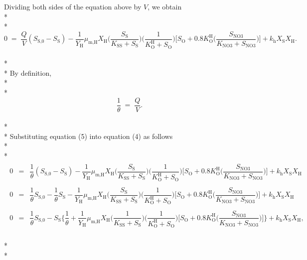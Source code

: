 \documentclass[]{article}
\begin{document}
Dividing both sides of the equation above by $V$, we obtain \\* \\* 
\begin{equation}
0 \; = \; \dfrac{Q}{V}(S_{\text{S,0}} - S_{\text{S}}) -\dfrac{1}{Y_{\text{H}}}\mu_{\text{m,H}}X_{\text{H}}\Bigg(\dfrac{S_{\text{S}}}{K_{\text{SS}}+S_{\text{S}}}\Bigg)\Bigg(\dfrac{1}{K^{\text{H}}_{\text{O}}+S_{\text{O}}}\Bigg)\Bigg[S_{\text{O}} + 0.8K^{\text{H}}_{\text{O}}\Bigg(\dfrac{S_{\text{NO3}}}{K_{\text{NO3}}+S_{\text{NO3}}}\Bigg)\Bigg] + k_{\text{h}}X_{\text{S}}X_{\text{H}}.
\end{equation} \\* \\* 
By definition, \\* \\* 
\begin{equation}
\dfrac{1}{\theta} \; = \; \dfrac{Q}{V}.
\end{equation} \\* \\* 
Substituting equation (5) into equation (4) as follows \\* \\* 
\begin{align}
\nonumber
\begin{array}{rcl}
0 &=& \dfrac{1}{\theta}(S_{\text{S,0}} - S_{\text{S}}) -\dfrac{1}{Y_{\text{H}}}\mu_{\text{m,H}}X_{\text{H}}\Bigg(\dfrac{S_{\text{S}}}{K_{\text{SS}}+S_{\text{S}}}\Bigg)\Bigg(\dfrac{1}{K^{\text{H}}_{\text{O}}+S_{\text{O}}}\Bigg)\Bigg[S_{\text{O}} + 0.8K^{\text{H}}_{\text{O}}\Bigg(\dfrac{S_{\text{NO3}}}{K_{\text{NO3}}+S_{\text{NO3}}}\Bigg)\Bigg] + k_{\text{h}}X_{\text{S}}X_{\text{H}} \\ \\
0 &=& \dfrac{1}{\theta}S_{\text{S,0}} - \dfrac{1}{\theta}S_{\text{S}} -\dfrac{1}{Y_{\text{H}}}\mu_{\text{m,H}}X_{\text{H}}\Bigg(\dfrac{S_{\text{S}}}{K_{\text{SS}}+S_{\text{S}}}\Bigg)\Bigg(\dfrac{1}{K^{\text{H}}_{\text{O}}+S_{\text{O}}}\Bigg)\Bigg[S_{\text{O}} + 0.8K^{\text{H}}_{\text{O}}\Bigg(\dfrac{S_{\text{NO3}}}{K_{\text{NO3}}+S_{\text{NO3}}}\Bigg)\Bigg] + k_{\text{h}}X_{\text{S}}X_{\text{H}} \\ \\
0 &=& \dfrac{1}{\theta}S_{\text{S,0}} - S_{\text{S}} \Bigg\{\dfrac{1}{\theta} + \dfrac{1}{Y_{\text{H}}}\mu_{\text{m,H}}X_{\text{H}}\Bigg(\dfrac{1}{K_{\text{SS}}+S_{\text{S}}}\Bigg)\Bigg(\dfrac{1}{K^{\text{H}}_{\text{O}}+S_{\text{O}}}\Bigg)\Bigg[S_{\text{O}} + 0.8K^{\text{H}}_{\text{O}}\Bigg(\dfrac{S_{\text{NO3}}}{K_{\text{NO3}}+S_{\text{NO3}}}\Bigg)\Bigg] \Bigg\} + k_{\text{h}}X_{\text{S}}X_{\text{H}},
\end{array}
\end{align} \\* \\* 
\end{document}

